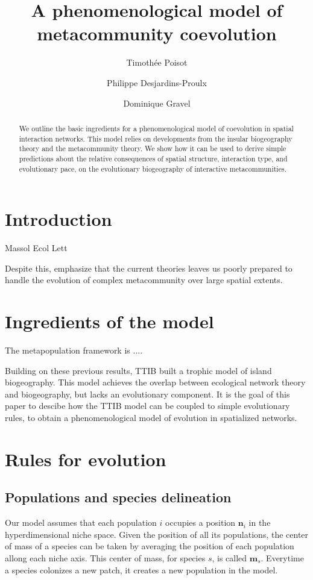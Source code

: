 \documentclass[10pt,twocolumn]{article}
\author{Timoth\'ee Poisot \and Philippe Desjardins-Proulx \and Dominique Gravel}
\title{A phenomenological model of metacommunity coevolution}
\begin{document}
	
\maketitle

\begin{abstract}
	We outline the basic ingredients for a phenomenological model of
	coevolution in spatial interaction networks. This model relies on
	developments from the insular biogeography theory and the metacommunity
	theory. We show how it can be used to derive simple predictions about the
	relative consequences of spatial structure, interaction type, and
	evolutionary pace, on the evolutionary biogeography of interactive
	metacommunities.
\end{abstract}

\section{Introduction}

Massol Ecol Lett

Despite this, \textcite{Urban2008} emphasize that the current theories leaves
us poorly prepared to handle the evolution of complex metacommunity over large
spatial extents.

\section{Ingredients of the model}

The metapopulation framework is ....

Building on these previous results, TTIB built a trophic model of island
biogeography. This model achieves the overlap between ecological network
theory and biogeography, but lacks an evolutionary component. It is the goal
of this paper to descibe how the TTIB model can be coupled to simple
evolutionary rules, to obtain a phenomenological model of evolution in
spatialized networks.

\section{Rules for evolution}

\subsection{Populations and species delineation}

Our model assumes that each population $i$ occupies a position
$\mathbf{n}_{i}$ in the hyperdimensional niche space. Given the position of
all its populations, the center of mass of a species can be taken by averaging
the position of each population allong each niche axis. This center of mass,
for species $s$, is called $\mathbf{m}_s$. Everytime a species colonizes a new
patch, it creates a new population in the model.
\end{document}
